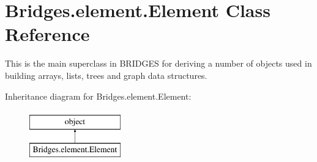\hypertarget{class_bridges_1_1element_1_1_element}{}\section{Bridges.\+element.\+Element Class Reference}
\label{class_bridges_1_1element_1_1_element}


This is the main superclass in B\+R\+I\+D\+G\+ES for deriving a number of objects used in building arrays, lists, trees and graph data structures.  


Inheritance diagram for Bridges.\+element.\+Element\+:\begin{figure}[H]
\begin{center}
\leavevmode
\includegraphics[height=2.000000cm]{class_bridges_1_1element_1_1_element}
\end{center}
\end{figure}
